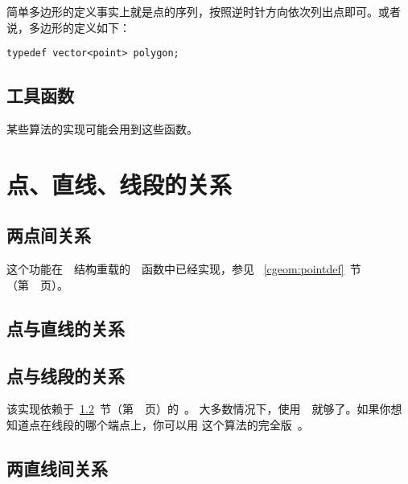 简单多边形的定义事实上就是点的序列，按照逆时针方向依次列出点即可。或者说，多边形的定义如下：

\begin{lstlisting}
typedef vector<point> polygon;
\end{lstlisting}


\subsection{工具函数}
\label{cgeom:utility}

某些算法的实现可能会用到这些函数。




\section{点、直线、线段的关系}

\subsection{两点间关系}

这个功能在~~结构重载的~~函数中已经实现，参见~
\ref{cgeom:pointdef}~节（第~\pageref{cgeom:pointdef}~页）。

\subsection{点与直线的关系}
\label{cgeom:relpl}



\subsection{点与线段的关系}

该实现依赖于~\ref{cgeom:relpl}~节（第~\pageref{cgeom:relpl}~页）的~。
大多数情况下，使用~~就够了。如果你想知道点在线段的哪个端点上，你可以用
这个算法的完全版~。



\subsection{两直线间关系}

